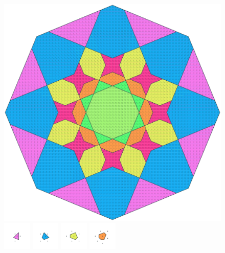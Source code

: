 \documentclass[text.tex]{subfiles}
\begin{document}
\clearpage
\pagestyle{fancy}
\fancyhf{}
\begin{figure}[h!]
\centering
\includegraphics[width=1\textwidth]{img/results/octagon/octagon_160355_(4_1alpha_4).pdf}
\includegraphics[width=0.12\textwidth]{img/results/octagon/octagon_160355_(4_1alpha_4)_001.pdf}
\includegraphics[width=0.12\textwidth]{img/results/octagon/octagon_160355_(4_1alpha_4)_002.pdf}
\includegraphics[width=0.12\textwidth]{img/results/octagon/octagon_160355_(4_1alpha_4)_003.pdf}
\includegraphics[width=0.12\textwidth]{img/results/octagon/octagon_160355_(4_1alpha_4)_004.pdf}

\end{figure}
\end{document}
